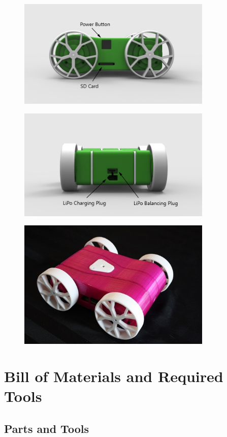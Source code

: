 \documentclass[12pt,titlepage,oneside]{memoir}
\begin{document}
\begin{figure}[!htbp]
\includegraphics[width=350px]{render/pibotport.jpg}
\centering
\end{figure}

\begin{figure}[!htbp]
\includegraphics[width=350px]{render/pibotback.jpg}
\centering
\end{figure}

\begin{figure}[!htbp]
\includegraphics[width=350px]{picture/bot1.jpg}
\centering
\end{figure}

\pagebreak
\chapter{Bill of Materials and Required Tools}
\section{Parts and Tools}
\end{document}
